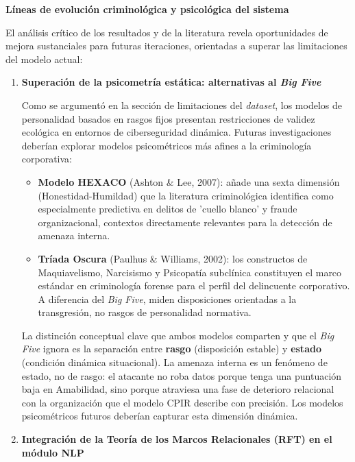 \documentclass[IB]{TFUOC}%
\begin{document}
\medskip
\noindent\textbf{Líneas de evolución criminológica y psicológica del sistema}

\medskip
\noindent El análisis crítico de los resultados y de la literatura revela 
oportunidades de mejora sustanciales para futuras iteraciones, orientadas 
a superar las limitaciones del modelo actual:

\begin{enumerate}

    \item \textbf{Superación de la psicometría estática: alternativas 
    al \textit{Big Five}}
    
    Como se argumentó en la sección de limitaciones del \textit{dataset}, los modelos de personalidad basados en rasgos fijos presentan restricciones de validez ecológica en entornos de ciberseguridad dinámica. Futuras investigaciones deberían explorar modelos 
    psicométricos más afines a la criminología corporativa:

    \begin{itemize}
        \item \textbf{Modelo HEXACO} (Ashton \& Lee, 2007): añade una sexta dimensión (Honestidad-Humildad) que la literatura criminológica identifica como especialmente predictiva en delitos de 'cuello blanco' y fraude organizacional, contextos 
        directamente relevantes para la detección de amenaza interna.
        
        \item \textbf{Tríada Oscura} (Paulhus \& Williams, 2002): los constructos de Maquiavelismo, Narcisismo y Psicopatía subclínica constituyen el marco estándar en criminología forense para el perfil del delincuente corporativo. A 
        diferencia del \textit{Big Five}, miden disposiciones orientadas a la transgresión, no rasgos de personalidad normativa.
    \end{itemize}
    
    \noindent La distinción conceptual clave que ambos modelos comparten y que el \textit{Big Five} ignora es la separación entre \textbf{rasgo} (disposición estable) y \textbf{estado} (condición dinámica situacional). La amenaza interna es un fenómeno de estado, no de rasgo: el atacante no roba datos porque tenga una puntuación baja en Amabilidad, sino porque atraviesa una fase de deterioro relacional con la organización que el modelo CPIR describe con precisión. Los modelos psicométricos futuros deberían capturar esta dimensión dinámica.

    \item \textbf{Integración de la Teoría de los Marcos Relacionales (RFT) en el módulo NLP}
    

\end{enumerate}
\end{document}
